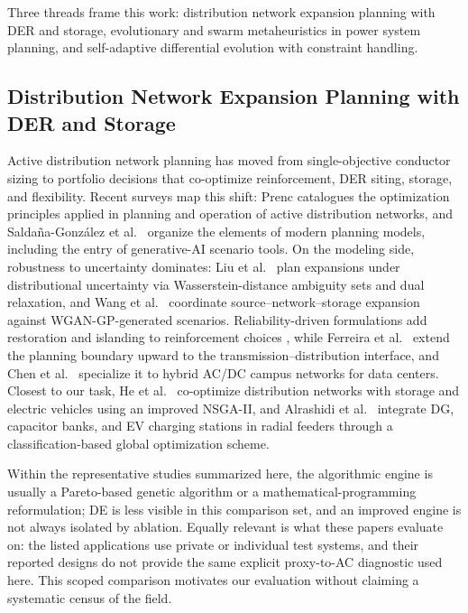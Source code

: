 \documentclass[energies,article,submit,moreauthors]{Definitions/mdpi}
\begin{document}
Three threads frame this work: distribution network expansion planning with DER and storage, evolutionary and swarm metaheuristics in power system planning, and self-adaptive differential evolution with constraint handling.

\subsection{Distribution Network Expansion Planning with DER and Storage}\label{distribution-network-expansion-planning-with-der-and-storage}

Active distribution network planning has moved from single-objective conductor sizing to portfolio decisions that co-optimize reinforcement, DER siting, storage, and flexibility. Recent surveys map this shift: Prenc \cite{ref8} catalogues the optimization principles applied in planning and operation of active distribution networks, and Salda\~{n}a-Gonz\'{a}lez et al.~\cite{ref9} organize the elements of modern planning models, including the entry of generative-AI scenario tools. On the modeling side, robustness to uncertainty dominates: Liu et al.~\cite{ref10} plan expansions under distributional uncertainty via Wasserstein-distance ambiguity sets and dual relaxation, and Wang et al.~\cite{ref11} coordinate source--network--storage expansion against WGAN-GP-generated scenarios. Reliability-driven formulations add restoration and islanding to reinforcement choices \cite{ref12}, while Ferreira et al.~\cite{ref13} extend the planning boundary upward to the transmission--distribution interface, and Chen et al.~\cite{ref14} specialize it to hybrid AC/DC campus networks for data centers. Closest to our task, He et al.~\cite{ref15} co-optimize distribution networks with storage and electric vehicles using an improved NSGA-II, and Alrashidi et al.~\cite{ref16} integrate DG, capacitor banks, and EV charging stations in radial feeders through a classification-based global optimization scheme.

Within the representative studies summarized here, the algorithmic engine is usually a Pareto-based genetic algorithm or a mathematical-programming reformulation; DE is less visible in this comparison set, and an improved engine is not always isolated by ablation. Equally relevant is what these papers evaluate on: the listed applications use private or individual test systems, and their reported designs do not provide the same explicit proxy-to-AC diagnostic used here. This scoped comparison motivates our evaluation without claiming a systematic census of the field.
\end{document}
